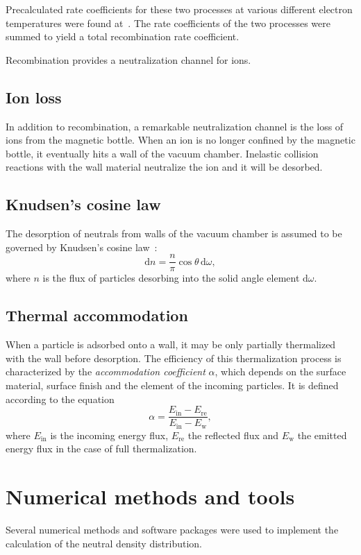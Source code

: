 \documentclass[a4paper,twoside,12pt]{article}
\begin{document}
Precalculated rate coefficients for these two processes at various different electron temperatures were found at~\cite{iaea:flychk}. The rate coefficients of the two processes were summed to yield a total recombination rate coefficient.

Recombination provides a neutralization channel for ions.

\subsection{Ion loss}
In addition to recombination, a remarkable neutralization channel is the loss of ions from the magnetic bottle. When an ion is no longer confined by the magnetic bottle, it eventually hits a wall of the vacuum chamber. Inelastic collision reactions with the wall material neutralize the ion and it will be desorbed.

\subsection{Knudsen's cosine law}
The desorption of neutrals from walls of the vacuum chamber is assumed to be governed by Knudsen's cosine law~\cite{knudsen:cosine}:
\begin{equation}
    \mathrm{d}n = \frac{n}{\pi}\cos\theta \,\mathrm{d}\omega,
\end{equation}
where $n$ is the flux of particles desorbing into the solid angle element $\mathrm{d}\omega$.

\subsection{Thermal accommodation}
When a particle is adsorbed onto a wall, it may be only partially thermalized with the wall before desorption. The efficiency of this thermalization process is characterized by the \emph{accommodation coefficient} $\alpha$, which depends on the surface material, surface finish and the element of the incoming particles. It is defined according to the equation
\begin{equation}
    \alpha = \frac{E_\text{in} - E_\text{re}}{E_\text{in} - E_\text{w}},
\end{equation}
where $E_\text{in}$ is the incoming energy flux, $E_\text{re}$ the reflected flux and $E_\text{w}$ the emitted energy flux in the case of full thermalization.~\cite{sandia:accom}

\section{Numerical methods and tools}
Several numerical methods and software packages were used to implement the calculation of the neutral density distribution.
\end{document}
